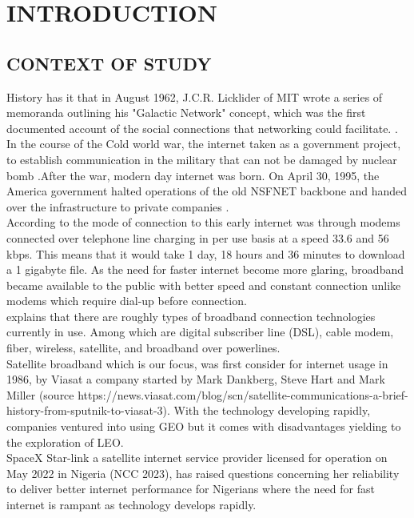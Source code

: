 \chapter{INTRODUCTION}
\section{CONTEXT OF STUDY}
History has it that in August 1962, J.C.R. Licklider of MIT wrote a series of memoranda outlining his "Galactic Network" concept, which was the first documented account of the social connections that networking could facilitate. \cite{leinerbrief}. In the course of the Cold world war, the internet taken as a government project, to establish communication in the military that can not be damaged by nuclear bomb \cite{abbate2000inventing}.After the war, modern day internet was born. On April 30, 1995, the America government halted operations of the old NSFNET backbone and handed over the infrastructure to private companies \cite{abbate2000inventing}.\\
	According to \cite{mack2020history} the mode of connection to this early internet was through modems connected over telephone line charging in per use basis at a speed 33.6 and 56 kbps. This means that it would take 1 day, 18 hours and 36 minutes to download a 1 gigabyte file. As the need for faster internet become more glaring, broadband became available to the public with better speed and constant connection unlike modems which require dial-up before connection.\\
	\cite{moeyaert2011network} explains that there are roughly types of broadband connection technologies currently in use. Among which are digital subscriber line (DSL), cable modem, fiber, wireless, satellite, and broadband over powerlines.\\
	Satellite broadband which is our focus, was first consider for internet usage in 1986, by Viasat a company started by Mark Dankberg, Steve Hart and Mark Miller (source https://news.viasat.com/blog/scn/satellite-communications-a-brief-history-from-sputnik-to-viasat-3). With the technology developing rapidly, companies ventured into using GEO but it comes with disadvantages yielding to the exploration of LEO.\\
	SpaceX Star-link a satellite internet service provider licensed for operation on May 2022 in Nigeria (NCC 2023), has raised questions concerning her reliability to deliver better internet performance for Nigerians where the need for fast internet is rampant as technology develops rapidly.
